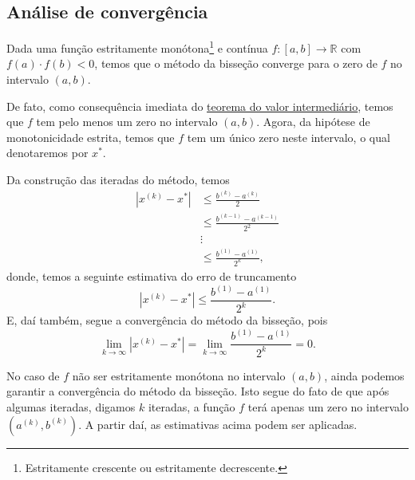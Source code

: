 \subsection{Análise de convergência}

Dada uma função estritamente monótona\footnote{Estritamente crescente ou estritamente decrescente.} e contínua $f:[a, b]\to\mathbb{R}$ com $f(a)\cdot f(b) < 0$, temos que o método da bisseção converge para o zero de $f$ no intervalo $(a, b)$. 

De fato, como consequência imediata do \href{https://phkonzen.github.io/notas/AnaliseMatematicaI/cap_continuidade_sec_prop_f_cont.html}{teorema do valor intermediário}, temos que $f$ tem pelo menos um zero no intervalo $(a, b)$. Agora, da hipótese de monotonicidade estrita, temos que $f$ tem um único zero neste intervalo, o qual denotaremos por $x^{*}$.

Da construção das iteradas do método, temos
\begin{align}
  |x^{(k)} - x^{*}| &\leq \frac{b^{(k)}-a^{(k)}}{2}\\
  &\leq \frac{b^{(k-1)}-a^{(k-1)}}{2^2}\\
  &\vdots \\
  &\leq \frac{b^{(1)}-a^{(1)}}{2^k},
\end{align}
donde, temos a seguinte estimativa do erro de truncamento
\begin{equation}\label{eq:bis_est_trunc}
  |x^{(k)} - x^{*}| \leq \frac{b^{(1)}-a^{(1)}}{2^k}.
\end{equation}
E, daí também, segue a convergência do método da bisseção, pois
\begin{equation}
  \lim_{k\to\infty} |x^{(k)}-x^{*}| = \lim_{k\to\infty} \frac{b^{(1)}-a^{(1)}}{2^k} = 0.
\end{equation}

\begin{obs}
  No caso de $f$ não ser estritamente monótona no intervalo $(a, b)$, ainda podemos garantir a convergência do método da bisseção. Isto segue do fato de que após algumas iteradas, digamos $k$ iteradas, a função $f$ terá apenas um zero no intervalo $(a^{(k)}, b^{(k)})$. A partir daí, as estimativas acima podem ser aplicadas.
\end{obs}

